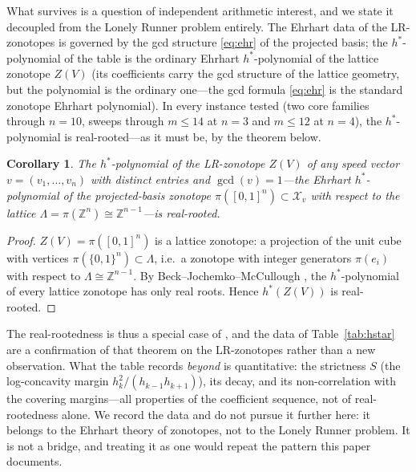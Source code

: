 \documentclass[11pt,a4paper]{article}
\numberwithin{equation}{section}
\theoremstyle{plain}
\newtheorem{corollary}[theorem]{Corollary}
\theoremstyle{definition}
\theoremstyle{remark}
\newcommand{\Z}{\mathbb{Z}}
\begin{document}
What survives is a question of independent arithmetic interest, and we
state it decoupled from the Lonely Runner problem entirely. The
Ehrhart data of the LR-zonotopes is governed by the gcd structure
\eqref{eq:ehr} of the projected basis; the $h^*$-polynomial of the table
is the ordinary Ehrhart $h^*$-polynomial of the lattice zonotope $Z(V)$
(its coefficients carry the gcd structure of the lattice geometry, but
the polynomial is the ordinary one---the gcd formula \eqref{eq:ehr} is
the standard zonotope Ehrhart polynomial). In every instance tested (two
core families through $n=10$, sweeps through $m\le14$ at $n=3$ and
$m\le12$ at $n=4$), the $h^*$-polynomial is real-rooted---as it must be,
by the theorem below.

\begin{corollary}\label{cor:hstarRR}
The $h^*$-polynomial of the LR-zonotope $Z(V)$ of any speed vector
$v=(v_1,\dots,v_n)$ with distinct entries and $\gcd(v)=1$---the
Ehrhart $h^*$-polynomial of the projected-basis zonotope
$\pi([0,1]^n)\subset\mathcal{X}_v$ with respect to the lattice
$\Lambda=\pi(\Z^n)\cong\Z^{n-1}$---is real-rooted.
\end{corollary}

\begin{proof}
$Z(V)=\pi([0,1]^n)$ is a lattice zonotope: a projection of the unit cube
with vertices $\pi(\{0,1\}^n)\subset\Lambda$, i.e.\ a zonotope with
integer generators $\pi(e_i)$ with respect to $\Lambda\cong\Z^{n-1}$. By
Beck--Jochemko--McCullough \cite{BJM}, the $h^*$-polynomial of every
lattice zonotope has only real roots. Hence $h^*(Z(V))$ is real-rooted.
\end{proof}

The real-rootedness is thus a special case of \cite{BJM}, and the data
of Table~\ref{tab:hstar} are a confirmation of that theorem on the
LR-zonotopes rather than a new observation. What the table records
\emph{beyond} \cite{BJM} is quantitative: the strictness $S$ (the
log-concavity margin $h_k^2/(h_{k-1}h_{k+1})$), its decay, and its
non-correlation with the covering margins---all properties of the
coefficient sequence, not of real-rootedness alone. We record the data
and do not pursue it further here: it belongs to the Ehrhart theory of
zonotopes, not to the Lonely Runner problem. It is not a bridge, and
treating it as one would repeat the pattern this paper documents.

\end{document}
